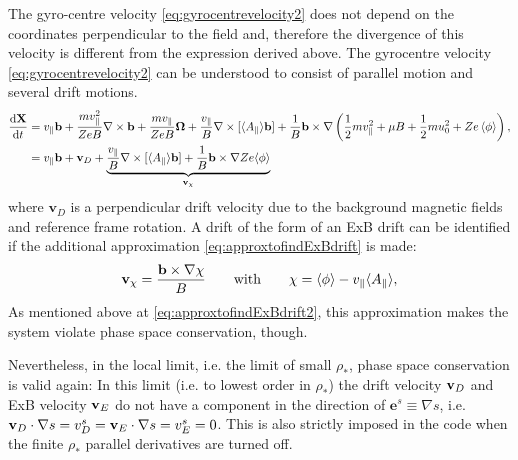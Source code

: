 The gyro-centre velocity \eqref{eq:gyrocentrevelocity2} does not depend on the coordinates perpendicular to the field and, therefore the divergence of this velocity is different from the expression derived above. 
The gyrocentre velocity \eqref{eq:gyrocentrevelocity2} can be
understood to consist of parallel motion and several drift motions.
\begin{align}
\frac{\mathrm{d} \mathbf{X}}{\mathrm{d} t}
&=
v_\parallel {\bf b} + \frac{m v_\parallel^2 }{ ZeB} \nabla \times {\bf b} + \frac{m v_\parallel }{ ZeB} {\bf \Omega}
+ \frac{v_\parallel }{ B} \nabla \times [ \langle A_\parallel \rangle {\bf b} ] 
+ \frac{1 }{ B} {\bf b} \times \nabla \left ( \frac{1 }{ 2} m v_\parallel^2 + \mu B  + \frac{1 }{ 2} m u_0^2 
+ Z e \left\langle \phi\right\rangle
\right ) ,
\\
&= v_\parallel\mathbf{b}  
+ {\bf v}_D 
+  \underbrace{\frac{v_\parallel }{ B} \nabla \times [ \langle A_\parallel \rangle {\bf b} ]  + \frac{1 }{ B} {\bf b} \times \nabla Z e \langle \phi \rangle}_{\mathbf{v}_\chi}
\end{align}
where $\mathbf{v}_D$ is a perpendicular drift velocity due to the background magnetic fields and reference frame rotation. A drift of the form of an ExB drift can be identified if the additional approximation \eqref{eq:approxtofindExBdrift} is made:
\begin{equation} 
{\bf v}_\chi = \frac{{\bf b} \times \nabla \chi}{B} \qquad 
\textrm{with} \qquad \chi = \langle \phi \rangle - v_\parallel \langle A_\parallel \rangle ,
\end{equation}
As mentioned above at \eqref{eq:approxtofindExBdrift2}, this approximation makes the system violate phase space conservation, though.

Nevertheless, in the local limit, i.e. the limit of small $\rho_*$, phase space conservation is valid again:
In this limit (i.e. to lowest order in $\rho_*$) the drift velocity ${\bf v}_D$ and ExB velocity ${\bf v}_E$ do not have a component in the direction of $\mathbf{e}^s\equiv\nabla s$, i.e. ${\bf v}_D\cdot \nabla s = v_D^s = {\bf v}_E \cdot \nabla s =v_E^s= 0$. 
This is also strictly imposed in the code when the finite $\rho_*$ parallel derivatives are turned off. 

